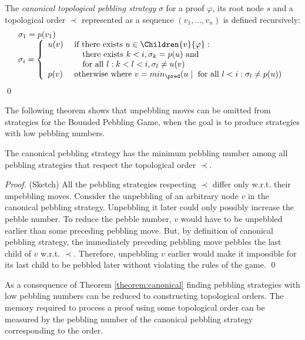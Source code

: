 \begin{definition}
The \emph{canonical topological pebbling strategy} $\sigma$ for a proof $\varphi$, its root node $s$ and a topological order $\prec$ represented as a sequence $(v_1,\dots,v_n)$ is defined recursively:
$$
\begin{array}{l}
\sigma_1 = p(v_1) \\
\sigma_i = 
	\left\{
	\begin{array}{ll}
		u(v) & \text{ if there exists } u \in \Children{v}{\varphi}: \\
		       & \quad \text{ there exists }k < i, \sigma_k = p(u) \text{ and }\\
					 & \quad \text{ for all } l: k < l < i, \sigma_l \neq u(v) \\
		p(v) & \text{ otherwise where } v = min_{\pred}(u \mid \text{ for all }l < i: \sigma_l \neq p(u))
	\end{array}
	\right.
\end{array}
$$
\qed
\end{definition}

The following theorem shows that unpebbling moves can be omitted from strategies for the Bounded Pebbling Game, when the goal is to produce strategies with low pebbling numbers.

\begin{theorem}
\label{theorem:canonical}
The canonical pebbling strategy has the minimum pebbling number among all pebbling strategies that respect the topological order $\prec$.
\end{theorem}
\begin{proof} (Sketch)
All the pebbling strategies respecting $\prec$ differ only w.r.t. their unpebbling moves.
Consider the unpebbling of an arbitrary node $v$ in the canonical pebbling strategy. Unpebbling it later could only possibly increase the pebble number. To reduce the pebble number, $v$ would have to be unpebbled earlier than some preceding pebbling move. But, by definition of canonical pebbling strategy, the immediately preceding pebbling move pebbles the last child of $v$ w.r.t. $\prec$. Therefore, unpebbling $v$ earlier would make it impossible for its last child to be pebbled later without violating the rules of the game.
\qed
\end{proof}

As a consequence of Theorem \ref{theorem:canonical} finding pebbling strategies with low pebbling numbers can be reduced to constructing topological orders.
The memory required to process a proof using some topological order can be measured by the pebbling number of the canonical pebbling strategy corresponding to the order.

